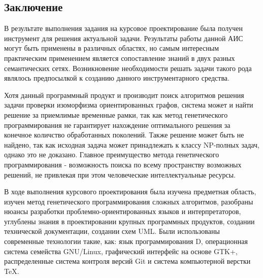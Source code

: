 \documentclass[russian,utf8,emptystyle]{eskdtext}
\begin{document}
\begin{spacing}{1.5}
\newpage
\section{Заключение}
В результате выполнения задания на курсовое проектирование была получен инструмент для решения актуальной задачи. Результаты работы данной АИС могут быть применены в различных областях, но самым интересным практическим применением является сопоставление знаний в двух разных семантических сетях. Возникновение необходимости решать задачи такого рода являлось предпосылкой к созданию данного инструментарного средства.

Хотя данный программный продукт и производит поиск алгоритмов решения задачи проверки изоморфизма ориентированных графов, система может и найти решение за приемлимые временные рамки, так как метод генетического программирования не гарантирует нахождение оптимального решения за конечное количство обработанных поколений. Также решение может быть не найдено, так как исходная задача может принадлежать к классу NP-полных задач, однако это не доказано. Главное преимущество метода генетического программирования - возможность поиска по всему пространству возможных решений, не привлекая при этом человеческие интеллектуальные ресурсы.

В ходе выполнения курсового проектирования была изучена предметная область, изучен метод генетического программирования сложных алгоритмов, разобраны нюансы разработки проблемно-ориентированных языков и интерпретаторов, углублены знания в проектировании крупных программных продуктов, создании технической документации, создании схем UML. Были использованы современные технологии такие, как: язык программирования D, операционная система семейства GNU/Linux, графический интерфейс на основе GTK+, распределенные система контроля версий Git и система компьютерной верстки \TeX.

\newpage

\end{spacing}
\end{document}
